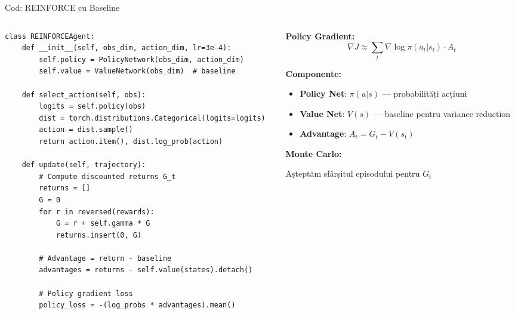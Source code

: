 \documentclass[aspectratio=169]{beamer}
\begin{document}
\begin{frame}[fragile]{Cod: REINFORCE cu Baseline}
  \begin{columns}
    \begin{column}{0.55\textwidth}
      \begin{lstlisting}[style=pythonstyle]
class REINFORCEAgent:
    def __init__(self, obs_dim, action_dim, lr=3e-4):
        self.policy = PolicyNetwork(obs_dim, action_dim)
        self.value = ValueNetwork(obs_dim)  # baseline
        
    def select_action(self, obs):
        logits = self.policy(obs)
        dist = torch.distributions.Categorical(logits=logits)
        action = dist.sample()
        return action.item(), dist.log_prob(action)
        
    def update(self, trajectory):
        # Compute discounted returns G_t
        returns = []
        G = 0
        for r in reversed(rewards):
            G = r + self.gamma * G
            returns.insert(0, G)
        
        # Advantage = return - baseline
        advantages = returns - self.value(states).detach()
        
        # Policy gradient loss
        policy_loss = -(log_probs * advantages).mean()
      \end{lstlisting}
    \end{column}
    \begin{column}{0.42\textwidth}
      \textbf{Policy Gradient:}
      \[\nabla J \approx \sum_t \nabla \log \pi(a_t|s_t) \cdot A_t\]
      
      \vspace{0.2cm}
      \textbf{Componente:}
      \begin{itemize}
        \item \textbf{Policy Net}: $\pi(a|s)$ — probabilități acțiuni
        \item \textbf{Value Net}: $V(s)$ — baseline pentru variance reduction
        \item \textbf{Advantage}: $A_t = G_t - V(s_t)$
      \end{itemize}
      
      \vspace{0.2cm}
      \textbf{Monte Carlo:}
      
      Așteptăm sfârșitul episodului pentru $G_t$
    \end{column}
  \end{columns}
\end{frame}
\end{document}
